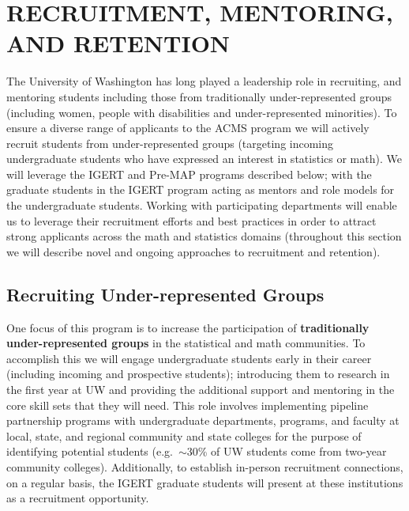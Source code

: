  \section{RECRUITMENT, MENTORING, AND RETENTION}

 The University of Washington has long played a leadership role in
 recruiting, and mentoring students including those from traditionally
 under-represented groups (including women, people with disabilities
 and under-represented minorities). To ensure a diverse range of
 applicants to the ACMS program we will actively recruit students from
 under-represented groups (targeting incoming undergraduate students
 who have expressed an interest in statistics or math).  We will
 leverage the IGERT and Pre-MAP programs described below; with the
 graduate students in the IGERT program acting as mentors and role
 models for the undergraduate students. Working with participating
 departments will enable us to leverage their recruitment efforts and
 best practices in order to attract strong applicants across the math
 and statistics domains (throughout this section we will describe
 novel and ongoing approaches to recruitment and retention).


\subsection{Recruiting Under-represented Groups}
 
One focus of this program is to increase the participation of
\textbf{traditionally under-represented groups} in the statistical and
math communities. To accomplish this we will engage undergraduate
students early in their career (including incoming and prospective
students); introducing them to research in the first year at UW and
providing the additional support and mentoring in the core skill sets
that they will need.  This role involves implementing pipeline
partnership programs with undergraduate departments, programs, and
faculty at local, state, and regional community and state colleges for
the purpose of identifying potential students (e.g.\ $\sim$30\% of UW
students come from two-year community colleges). Additionally, to
establish in-person recruitment connections, on a regular basis, the
IGERT graduate students will present at these institutions as a
recruitment opportunity.


